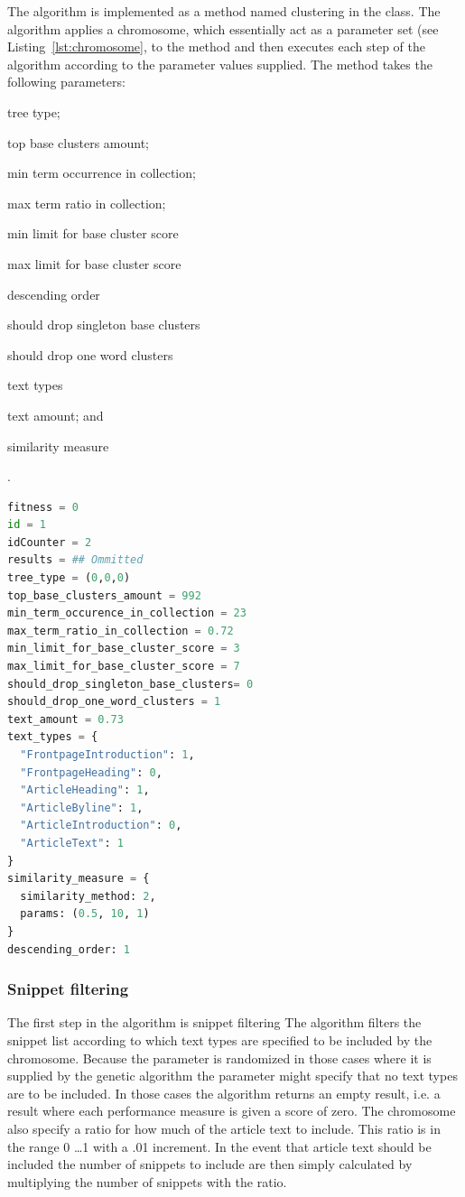 The \CTC algorithm is implemented as a method named clustering in the \CTC class. The algorithm applies a chromosome, which essentially act as a parameter set (see Listing~\ref{lst:chromosome}, to the method and then executes each step of the \CTC algorithm according to the parameter values supplied. The method takes the following parameters:
\begin{inparaenum}[\itshape 1\upshape)]
\item tree type;
\item top base clusters amount;
\item min term occurrence in collection;
\item max term ratio in collection;
\item min limit for base cluster score
\item max limit for base cluster score
\item descending order
\item should drop singleton base clusters
\item should drop one word clusters
\item text types
\item text amount; and
\item similarity measure
\end{inparaenum}.




\begin{lstlisting}[float=t, language=python, label=lst:chromosome, caption={An example chromosome}]
fitness = 0
id = 1
idCounter = 2
results = ## Ommitted
tree_type = (0,0,0)
top_base_clusters_amount = 992
min_term_occurence_in_collection = 23
max_term_ratio_in_collection = 0.72
min_limit_for_base_cluster_score = 3
max_limit_for_base_cluster_score = 7
should_drop_singleton_base_clusters= 0
should_drop_one_word_clusters = 1
text_amount = 0.73
text_types = {
  "FrontpageIntroduction": 1,
  "FrontpageHeading": 0,
  "ArticleHeading": 1,
  "ArticleByline": 1,
  "ArticleIntroduction": 0,
  "ArticleText": 1
}
similarity_measure = {
  similarity_method: 2,
  params: (0.5, 10, 1)
}
descending_order: 1
\end{lstlisting}

\subsubsection{Snippet filtering}
The first step in the \CTC algorithm is snippet filtering The algorithm filters the snippet list according to which text types are specified to be included by the chromosome. Because the parameter is randomized in those cases where it is supplied by the genetic algorithm the parameter might specify that no text types are to be included. In those cases the algorithm returns an empty result, i.e. a result where each performance measure is given a score of zero. The chromosome also specify a ratio for how much of the article text to include. This ratio is in the range 0 \dots 1 with a .01 increment. In the event that article text should be included the number of snippets to include are then simply calculated by multiplying the number of snippets with the ratio.

